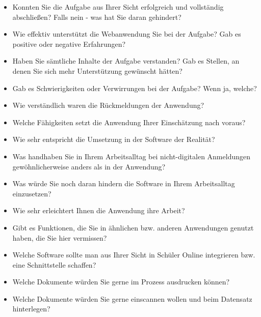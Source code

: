 \begin{itemize}
    \item Konnten Sie die Aufgabe aus Ihrer Sicht erfolgreich und vollständig abschließen? Falls nein - was hat Sie daran gehindert?
    \item Wie effektiv unterstützt die Webanwendung Sie bei der Aufgabe?  Gab es positive oder negative Erfahrungen?
    \item Haben Sie sämtliche Inhalte der Aufgabe verstanden? Gab es Stellen, an denen Sie sich mehr Unterstützung gewünscht hätten?
    \item Gab es Schwierigkeiten oder Verwirrungen bei der Aufgabe? Wenn ja, welche?
    \item Wie verständlich waren die Rückmeldungen der Anwendung?
    \item Welche Fähigkeiten setzt die Anwendung Ihrer Einschätzung nach voraus?
    \item Wie sehr entspricht die Umsetzung in der Software der Realität?
    \item Was handhaben Sie in Ihrem Arbeitsalltag bei nicht-digitalen Anmeldungen gewöhnlicherweise anders als in der Anwendung?
    \item Was würde Sie noch daran hindern die Software in Ihrem Arbeitsalltag einzusetzen?
    \item Wie sehr erleichtert Ihnen die Anwendung ihre Arbeit?
    \item Gibt es Funktionen, die Sie in ähnlichen bzw. anderen Anwendungen genutzt haben, die Sie hier vermissen?
    \item Welche Software sollte man aus Ihrer Sicht in Schüler Online integrieren bzw. eine Schnittstelle schaffen?
    \item Welche Dokumente würden Sie gerne im Prozess ausdrucken können?
    \item Welche Dokumente würden Sie gerne einscannen wollen und beim Datensatz hinterlegen?
\end{itemize}
